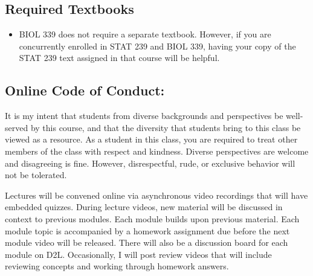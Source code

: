 \documentclass{tufte-handout}
\begin{document}
\begin{fullwidth}
\subsection{Required Textbooks}

\begin{itemize}
	\item BIOL 339 does not require a separate textbook. However, if you are concurrently enrolled in STAT 239 and BIOL 339, having your copy of the STAT 239 text assigned in that course will be helpful.
\end{itemize}










\subsection{Online Code of Conduct: } 

It is my intent that students from diverse backgrounds and perspectives be well-served by this course, and that the diversity that students bring to this class be viewed as a resource. As a student in this class, you are required to treat other members of the class with respect and kindness. Diverse perspectives are welcome and disagreeing is fine. However, disrespectful, rude, or exclusive behavior will not be tolerated. 


\end{fullwidth}


 Lectures will be convened online via asynchronous video recordings that will have embedded quizzes. During lecture videos, new material will be discussed in context to previous modules. Each module builds upon previous material. Each module topic is accompanied by a homework assignment due before the next module video will be released. There will also be a discussion board for each module on D2L. Occasionally, I will post review videos that will include reviewing concepts and working through homework answers. 
\end{document}
